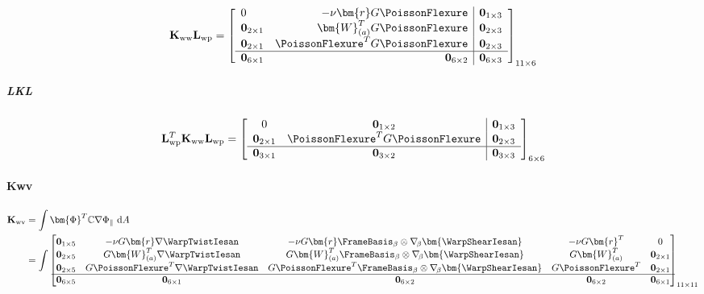 \begin{Quote}

\[
\mathbf{K}_{\rm ww}\mathbf{L}_{\rm wp} = \left[
\begin{array}{lr|c}
    0 & -\nu\bm{r}G \PoissonFlexure & \mathbf{0}_{1\times3} \\
    \mathbf{0}_{2\times 1} & \bm{W}_{(a)}^TG \PoissonFlexure & \mathbf{0}_{2\times 3}\\
    \mathbf{0}_{2\times 1} & \PoissonFlexure^TG \PoissonFlexure
    & \mathbf{0}_{2\times 3}
    \\ \hline
    \mathbf{0}_{6\times1}
    & \mathbf{0}_{6\times2} & \mathbf{0}_{6\times 3}
\end{array}
\right]_{11\times 6}
\]
\end{Quote}

\subparagraph{LKL}
\begin{equation}
\mathbf{L}_{\rm wp}^T\mathbf{K}_{\rm ww}\mathbf{L}_{\rm wp} = \left[
\begin{array}{cc|cc}
    0 & \mathbf{0}_{1\times2} & \mathbf{0}_{1\times3} \\
    \mathbf{0}_{2\times1} & \PoissonFlexure^TG\PoissonFlexure & \mathbf{0}_{2\times3} \\ \hline 
    \mathbf{0}_{3\times1} & \mathbf{0}_{3\times2} & \mathbf{0}_{3\times3}
\end{array}
\right]_{6\times6}
\label{eq:LwpKwwLwp}
\end{equation}


\paragraph{Kwv}
$$
\begin{aligned}
\mathbf{K}_{\rm wv} &= \int \bm{\Phi}^T\mathbb{C}\nabla\Phi_{\parallel}\mathrm{~d}A \\
&= \int \begin{bmatrix}
\mathbf{0}_{1 \times 5} 
& -\nu G \bm{r} \nabla\WarpTwistIesan
& -\nu G \bm{r} \FrameBasis_{\beta} \otimes \nabla_{\!\beta} \bm{\WarpShearIesan}
& -\nu G \bm{r}^T
& 0
\\
\mathbf{0}_{2 \times 5} 
& G\bm{W}_{(a)}^T \nabla \WarpTwistIesan 
& G\bm{W}_{(a)}^T \FrameBasis_{\beta} \otimes \nabla_{\!\beta} \bm{\WarpShearIesan} 
& G\bm{W}_{(a)}^T & \mathbf{0}_{2\times1}\\
\mathbf{0}_{2 \times 5} 
& G\PoissonFlexure^T \nabla \WarpTwistIesan 
& G\PoissonFlexure^T \FrameBasis_{\beta} \otimes \nabla_{\!\beta} \bm{\WarpShearIesan} 
& G\PoissonFlexure^T & \mathbf{0}_{2\times1}\\ \hline
\mathbf{0}_{6 \times 5} & \mathbf{0}_{6\times 1} & \mathbf{0}_{6\times 2}& \mathbf{0}_{6\times 2} & \mathbf{0}_{6\times 1}
\end{bmatrix}_{11\times11} \\
\end{aligned}
$$

